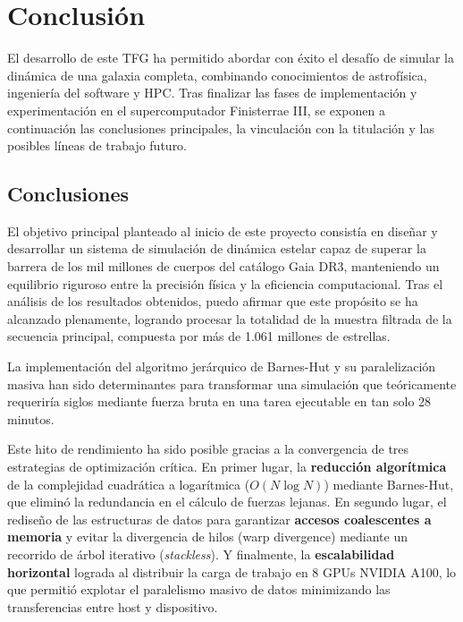 \chapter{Conclusión}
\label{chap:conclusions}

El desarrollo de este TFG ha permitido abordar con éxito el desafío de simular la dinámica de una galaxia completa, combinando conocimientos de astrofísica, ingeniería del software y HPC.
Tras finalizar las fases de implementación y experimentación en el supercomputador Finisterrae III, se exponen a continuación las conclusiones principales, la vinculación con la titulación y las posibles líneas de trabajo futuro.

\section{Conclusiones}\label{sec:conclusiones}

El objetivo principal planteado al inicio de este proyecto consistía en diseñar y desarrollar un sistema de simulación de dinámica estelar capaz de superar la barrera de los mil millones de cuerpos del catálogo Gaia DR3, manteniendo un equilibrio riguroso entre la precisión física y la eficiencia computacional.
Tras el análisis de los resultados obtenidos, puedo afirmar que este propósito se ha alcanzado plenamente, logrando procesar la totalidad de la muestra filtrada de la secuencia principal, compuesta por más de 1.061 millones de estrellas.

La implementación del algoritmo jerárquico de Barnes-Hut y su paralelización masiva han sido determinantes para transformar una simulación que teóricamente requeriría siglos mediante fuerza bruta en una tarea ejecutable en tan solo 28 minutos.

Este hito de rendimiento ha sido posible gracias a la convergencia de tres estrategias de optimización crítica.
En primer lugar, la \textbf{reducción algorítmica} de la complejidad cuadrática a logarítmica ($O(N \log N)$) mediante Barnes-Hut, que eliminó la redundancia en el cálculo de fuerzas lejanas.
En segundo lugar, el rediseño de las estructuras de datos para garantizar \textbf{accesos coalescentes a memoria} y evitar la divergencia de hilos (warp divergence) mediante un recorrido de árbol iterativo (\textit{stackless}).
Y finalmente, la \textbf{escalabilidad horizontal} lograda al distribuir la carga de trabajo en 8 GPUs NVIDIA A100, lo que permitió explotar el paralelismo masivo de datos minimizando las transferencias entre host y dispositivo.

